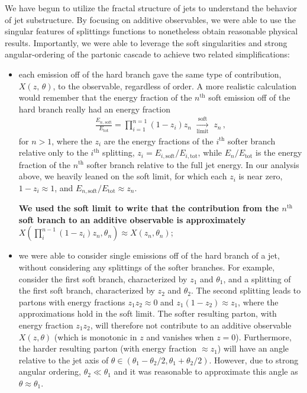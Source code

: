 We have begun to utilize the fractal structure of jets to understand the behavior of jet substructure.
%
By focusing on additive observables, we were able to use the singular features of splittings functions to nonetheless obtain reasonable physical results.
%
Importantly, we were able to leverage the soft singularities and strong angular-ordering of the partonic cascade to achieve two related simplifications:

\begin{itemize}
     \item
        each emission off of the hard branch gave the same type of contribution, \(X(z,\,\theta)\), to the observable, regardless of order.
        A more realistic calculation would remember that the energy fraction of the \(n^\text{th}\) soft emission off of the hard branch really had an energy fraction
        \begin{align}
            \frac{E_{n,\,\text{soft}}}{E_\text{tot}}
            =
            \prod_{i = 1}^{n=1}
            (1-z_i)
            z_n
            \,\,
            \xrightarrow[\text{limit}]{\text{soft}}
            \,\,
            z_n
            \,,
        \end{align}
        for \(n > 1\), where the \(z_i\) are the energy fractions of the \(i^\text{th}\) softer branch relative only to the \(i^\text{th}\) splitting, \(z_i = E_{i,\text{soft}}/E_{i,\text{tot}}\), while \(E_n/E_\text{tot}\) is the energy fraction of the \(n^\text{th}\) softer branch relative to the full jet energy.
        In our analysis above, we heavily leaned on the soft limit, for which each \(z_i\) is near zero, \(1-z_i \approx 1\), and \(E_{n,\text{soft}}/E_\text{tot} \approx z_n\).

        \textbf{We used the soft limit to write that the contribution from the \(n^\text{th}\) soft branch to an additive observable is approximately} \(X(\prod_{i}^{n-1} (1-z_i) z_n, \theta_n) \approx X(z_n, \theta_n)\);


     \item
         we were able to consider single emissions off of the hard branch of a jet, without considering any splittings of the softer branches.
         For example, consider the first soft branch, characterized by \(z_1\) and \(\theta_1\), and a splitting of the first soft branch, characterized by \(z_2\) and \(\theta_2\).
         The second splitting leads to partons with energy fractions \(z_1 z_2 \approx 0\) and \(z_1 (1-z_2) \approx z_1\), where the approximations hold in the soft limit.
         The softer resulting parton, with energy fraction \(z_1 z_2\), will therefore not contribute to an additive observable \(X(z,\theta)\) (which is monotonic in \(z\) and vanishes when \(z = 0\)).
         Furthermore, the harder resulting parton (with energy fraction \(\approx z_1\)) will have an angle relative to the jet axis of \(\theta \in (\theta_1 - \theta_2/2, \theta_1 + \theta_2/2)\).
         However, due to strong angular ordering, \(\theta_2 \ll \theta_1\) and it was reasonable to approximate this angle as \(\theta \approx \theta_1\).


\end{itemize}
